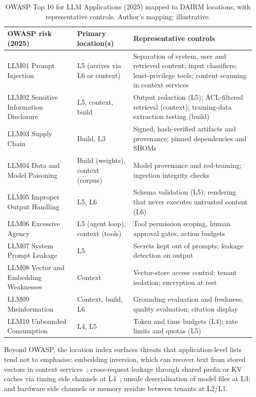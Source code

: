 \documentclass[11pt]{article}
\begin{document}
\begin{table}[!htbp]
\centering
\caption{OWASP Top 10 for LLM Applications (2025) mapped to DAIRM locations, with representative controls. Author's mapping; illustrative.}
\label{tab:owasp}
\small
\begin{tabularx}{\textwidth}{@{}>{\raggedright\arraybackslash}p{4.1cm}>{\raggedright\arraybackslash}p{2.9cm}Y@{}}
\toprule
\textbf{OWASP risk (2025)} & \textbf{Primary location(s)} & \textbf{Representative controls}\\
\midrule
LLM01 Prompt Injection & L5 (arrives via L6 or context) & Separation of system, user and retrieved content; input classifiers; least-privilege tools; content scanning in context services\\
LLM02 Sensitive Information Disclosure & L5, context, build & Output redaction (L5); ACL-filtered retrieval (context); training-data extraction testing (build)\\
LLM03 Supply Chain & Build, L3 & Signed, hash-verified artifacts and provenance; pinned dependencies and SBOMs\\
LLM04 Data and Model Poisoning & Build (weights), context (corpus) & Model provenance and red-teaming; ingestion integrity checks\\
LLM05 Improper Output Handling & L5, L6 & Schema validation (L5); rendering that never executes untrusted content (L6)\\
LLM06 Excessive Agency & L5 (agent loop), context (tools) & Tool permission scoping, human approval gates, action budgets\\
LLM07 System Prompt Leakage & L5 & Secrets kept out of prompts; leakage detection on output\\
LLM08 Vector and Embedding Weaknesses & Context & Vector-store access control; tenant isolation; encryption at rest\\
LLM09 Misinformation & Context, build, L6 & Grounding evaluation and freshness; quality evaluation; citation display\\
LLM10 Unbounded Consumption & L4, L5 & Token and time budgets (L4); rate limits and quotas (L5)\\
\bottomrule
\end{tabularx}
\end{table}

Beyond OWASP, the location index surfaces threats that application-level lists tend not to emphasise: embedding inversion, which can recover text from stored vectors in context services~\cite{morris2023inversion}; cross-request leakage through shared prefix or KV caches via timing side channels at L4~\cite{song2024earlybird}; unsafe deserialisation of model files at L3; and hardware side channels or memory residue between tenants at L2/L1.
\end{document}
